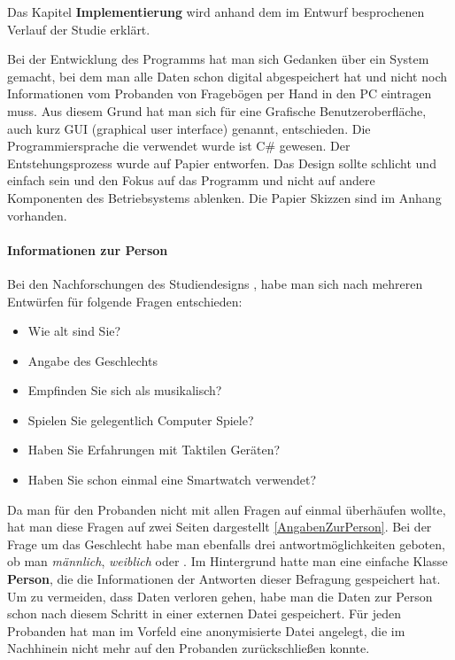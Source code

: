 
Das Kapitel \textbf{Implementierung} wird anhand dem im Entwurf besprochenen Verlauf der Studie erkl{\"a}rt.

Bei der Entwicklung des Programms hat man sich Gedanken {\"u}ber ein System gemacht, bei dem man alle Daten schon digital abgespeichert hat und nicht noch Informationen vom Probanden von Fragebögen per Hand in den PC eintragen muss. Aus diesem Grund hat man sich f{\"u}r eine Grafische Benutzeroberfl{\"a}che, auch kurz GUI (graphical user interface) genannt, entschieden. 
Die Programmiersprache die verwendet wurde ist C\# gewesen.
Der Entstehungsprozess wurde auf Papier entworfen. Das Design sollte schlicht und einfach sein und den Fokus auf das Programm und nicht auf andere Komponenten des Betriebsystems ablenken. Die Papier Skizzen sind im Anhang vorhanden.

\paragraph{Informationen zur Person}
Bei den Nachforschungen des Studiendesigns \cite{benyon2005designing}, habe man sich nach mehreren Entw{\"u}rfen f{\"u}r folgende Fragen entschieden:

\begin{itemize}
\item Wie alt sind Sie?
\item Angabe des Geschlechts
\item Empfinden Sie sich als musikalisch? 
\item Spielen Sie gelegentlich Computer Spiele?
\item Haben Sie Erfahrungen mit Taktilen Ger{\"a}ten?
\item Haben Sie schon einmal eine Smartwatch verwendet?
\end{itemize}

Da man f{\"u}r den Probanden nicht mit allen Fragen auf einmal {\"u}berh{\"a}ufen wollte, hat man diese Fragen auf zwei Seiten dargestellt \autoref{AngabenZurPerson}. Bei der Frage um das Geschlecht habe man ebenfalls drei antwortmöglichkeiten geboten, ob man \textit{männlich}, \textit{weiblich} oder .
Im Hintergrund hatte man eine einfache Klasse \textbf{Person}, die die Informationen der Antworten dieser Befragung gespeichert hat. Um zu vermeiden, dass Daten verloren gehen, habe man die Daten zur Person schon nach diesem Schritt in einer externen Datei gespeichert. F{\"u}r jeden Probanden hat man im Vorfeld eine anonymisierte Datei angelegt, die im Nachhinein nicht mehr auf den Probanden zur{\"u}ckschlie{\ss}en konnte.  

